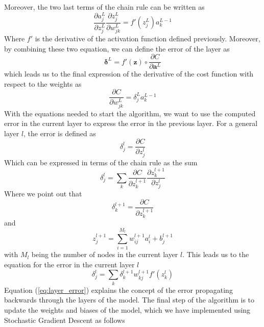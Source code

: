 \documentclass
[twocolumn,
secnumarabic,
nobibnotes,
aps,
prl,
reprint,
groupedaddress,
amsmath,
amssymb
]{revtex4-2}
\begin{document}
Moreover, the two last terms of the chain rule can be written as
\begin{equation}
  \nonumber
  \frac{\partial{a_j^L}}{\partial{z_j^L}}\frac{\partial{z_j^L}}{\partial{w_{jk}^L}} = f'(z_j^L)a_k^{L-1}
\end{equation}
Where $f'$ is the derivative of the activation function defined previously. Moreover, by combining these two equation, we can define the error of the layer as
\begin{equation}
  \nonumber
  \bm{\delta}^L = f'(\bm{z}) \circ \frac{\partial{C}}{\partial{\bm{a}^L}}
\end{equation}
which leads us to the final expression of the derivative of the cost function with respect to the weights as
\begin{equation}
  \nonumber
  \frac{\partial{C}}{\partial{w_{jk}^L}} = \delta_j^La_k^{L-1}
\end{equation}
With the equations needed to start the algorithm, we want to use the computed error in the current layer to express the error in the previous layer. For a general layer $l$, the error is defined as
\begin{equation}
  \nonumber
  \delta_j^l = \frac{\partial{C}}{\partial{z_j^l}}
\end{equation}
Which can be expressed in terms of the chain rule as the sum
\begin{equation}
  \nonumber
  \delta_j^l = \sum_k\frac{\partial{C}}{\partial{z_k^{l+1}}}\frac{\partial{z_k^{l+1}}}{\partial{z_j^l}}
\end{equation}
Where we point out that
\begin{equation}
  \nonumber
  \delta_k^{l+1} = \frac{\partial{C}}{\partial{z_k^{l+1}}}
\end{equation}
and
\begin{equation}
  \nonumber
  z_j^{l+1} = \sum_{i=1}^{M_l}w_{ij}^{l+1}a_i^l+b_j^{l+1}
\end{equation}
with $M_l$ being the number of nodes in the current layer $l$. This leads us to the equation for the error in the current layer $l$
\begin{equation}
  \label{eq:layer_error}
  \delta_j^l = \sum_k\delta_k^{l+1}w_{kj}^{l+1}f'(z_k^l)
\end{equation}
Equation (\ref{eq:layer_error}) explains the concept of the error propagating backwards through the layers of the model. The final step of the algorithm is to update the weights and biases of the model, which we have implemented using Stochastic Gradient Descent as follows
\end{document}
